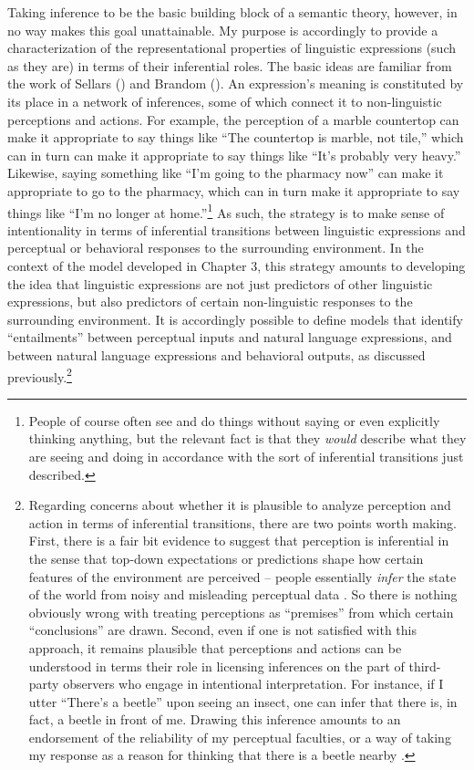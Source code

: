 Taking inference to be the basic building block of a semantic theory, however, in no way makes this goal unattainable. My purpose is accordingly to provide a characterization of the representational properties of linguistic expressions (such as they are) in terms of their inferential roles. The basic ideas are familiar from the work of Sellars (\citeyear{Sellars:1953,Sellars:1954}) and Brandom (\citeyear{Brandom:2000,Brandom:1994}). An expression's meaning is constituted by its place in a network of inferences, some of which connect it to non-linguistic perceptions and actions. For example, the perception of a marble countertop can make it appropriate to say things like ``The countertop is marble, not tile,'' which can in turn can make it appropriate to say things like ``It's probably very heavy.'' Likewise, saying something like ``I'm going to the pharmacy now'' can make it appropriate to go to the pharmacy, which can in turn make it appropriate to say things like ``I'm no longer at home.''\footnote{People of course often see and do things without saying or even explicitly thinking anything, but the relevant fact is that they \textit{would} describe what they are seeing and doing in accordance with the sort of inferential transitions just described.} As such, the strategy is to make sense of intentionality in terms of inferential transitions between linguistic expressions and perceptual or behavioral responses to the surrounding environment. In the context of the model developed in Chapter 3, this strategy amounts to developing the idea that linguistic expressions are not just predictors of other linguistic expressions, but also predictors of certain non-linguistic responses to the surrounding environment. It is accordingly possible to define models that identify ``entailments'' between perceptual inputs and natural language expressions, and between natural language expressions and behavioral outputs, as discussed previously.\footnote{Regarding concerns about whether it is plausible to analyze perception and action in terms of inferential transitions, there are two points worth making. First, there is a fair bit evidence to suggest that perception is inferential in the sense that top-down expectations or predictions shape how certain features of the environment are perceived -- people essentially \textit{infer} the state of the world from noisy and misleading perceptual data \citep{clark:2013,Lupyan:2015}. So there is nothing obviously wrong with treating perceptions as ``premises'' from which certain ``conclusions'' are drawn. Second, even if one is not satisfied with this approach, it remains plausible that perceptions and actions can be understood in terms their role in licensing inferences on the part of third-party observers who engage in intentional interpretation. For instance, if I utter ``There's a beetle'' upon seeing an insect, one can infer that there is, in fact, a beetle in front of me. Drawing this inference amounts to an endorsement of the reliability of my perceptual faculties, or a way of taking my response as a reason for thinking that there is a beetle nearby \citep{Brandom:1994,Brandom:2009}.}
	
